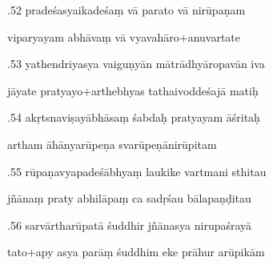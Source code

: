 \documentclass[article,12pt,a4paper]{memoir}%
\newcounter{parCount}
\begin{document}
	  
	  \pstart {}.52 pradeśasyaikadeśaṃ vā parato vā nirūpaṇam 
	{}
	\pend%
      

	  
	  \pstart \leavevmode%
	viparyayam abhāvaṃ vā vyavahāro+anuvartate 
	{}
	\pend%
      

	  
	  \pstart {}.53 yathendriyasya vaiguṇyān mātrādhyāropavān iva 
	{}
	\pend%
      

	  
	  \pstart \leavevmode%
	jāyate pratyayo+arthebhyas tathaivoddeśajā matiḥ 
	{}
	\pend%
      

	  
	  \pstart {}.54 akṛtsnaviṣayābhāsaṃ śabdaḥ pratyayam āśritaḥ 
	{}
	\pend%
      

	  
	  \pstart \leavevmode%
	artham āhānyarūpeṇa svarūpeṇānirūpitam 
	{}
	\pend%
      

	  
	  \pstart {}.55 rūpaṇavyapadeśābhyaṃ laukike vartmani sthitau 
	{}
	\pend%
      

	  
	  \pstart \leavevmode%
	jñānaṃ praty abhilāpaṃ ca sadṛśau bālapaṇḍitau 
	{}
	\pend%
      

	  
	  \pstart {}.56 sarvārtharūpatā śuddhir jñānasya nirupaśrayā 
	{}
	\pend%
      

	  
	  \pstart \leavevmode%
	tato+apy asya parāṃ śuddhim eke prāhur arūpikām 
	{}
	\pend%
      
\end{document}
